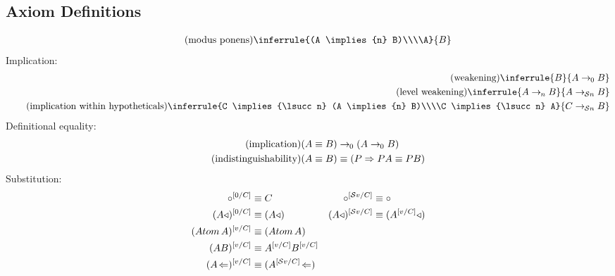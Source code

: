 \documentclass{article}
\begin{document}
  \subsection{Axiom Definitions}
  \setlength{\jot}{1.4em}
  \begin{gather*}
    \tag{modus ponens}\label{mp}
    \inferrule{(A \implies{n} B)\\\\A}{B}\\
  \end{gather*}
  Implication:
  \begin{align*}
    \tag{weakening}
    \inferrule{B}{A \implies{\lzero} B}\\
    \tag{level weakening}
    \inferrule{A \implies{n} B}{A \implies{\lsucc n} B}\\
    \tag{implication within hypotheticals}
    \inferrule{C \implies{\lsucc n} (A \implies{n} B)\\\\C \implies{\lsucc n} A}{C \implies{\lsucc n} B}\\
  \end{align*}
  \setlength{\jot}{0.4em}
  Definitional equality:
  \begin{align*}
    \tag{implication}
    (A \equiv B) &\rightarrow_{\hspace{-0.04em}0} (A \rightarrow_{\hspace{-0.04em}0} B)\\
    \tag{indistinguishability}
    (A \equiv B) &\equiv (P \Rightarrow PA \equiv PB)\\
  \end{align*}
  Substitution:
  \begin{align*}
    \circ^{[{0}{/}{C}]} &\equiv C & \circ^{[{\mathcal{S} v}{/}{C}]} &\equiv \circ\\
    (A\triangleleft)^{[{0}{/}{C}]} &\equiv (A\triangleleft) & (A\triangleleft)^{[{\mathcal{S} v}{/}{C}]} &\equiv (A^{[{v}{/}{C}]}\triangleleft)\\
    (Atom\,A)^{[{v}{/}{C}]} &\equiv (Atom\,A)\\
    (AB)^{[{v}{/}{C}]} &\equiv A^{[{v}{/}{C}]}B^{[{v}{/}{C}]}\\
    (A\!\Leftarrow)^{[{v}{/}{C}]} &\equiv (A^{[{\mathcal{S} v}{/}{C}]}\!\Leftarrow)\\
  \end{align*}
\end{document}
